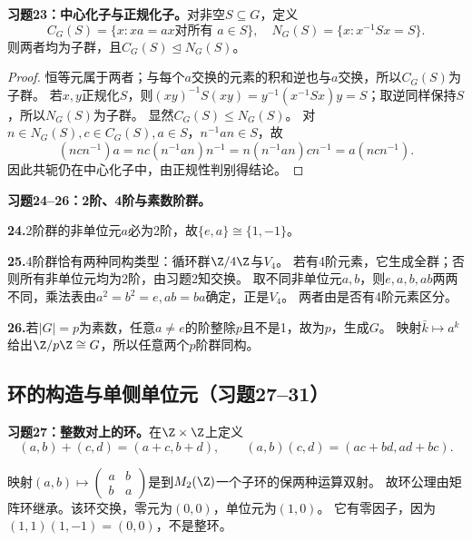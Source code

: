 \begin{problem}
\textbf{习题23：中心化子与正规化子。}对非空$S\subseteq G$，定义
\[
C_G(S)=\{x:xa=ax\text{对所有 }a\in S\},\quad
N_G(S)=\{x:x^{-1}Sx=S\}.
\]
则两者均为子群，且$C_G(S)\trianglelefteq N_G(S)$。
\end{problem}
\begin{proof}
恒等元属于两者；与每个$a$交换的元素的积和逆也与$a$交换，所以$C_G(S)$为子群。
若$x,y$正规化$S$，则$(xy)^{-1}S(xy)=y^{-1}(x^{-1}Sx)y=S$；取逆同样保持$S$，所以$N_G(S)$为子群。
显然$C_G(S)\leq N_G(S)$。
对$n\in N_G(S),c\in C_G(S),a\in S$，$n^{-1}an\in S$，故
\[
(ncn^{-1})a=n c(n^{-1}an)n^{-1}
=n(n^{-1}an)c n^{-1}=a(ncn^{-1}).
\]
因此共轭仍在中心化子中，由正规性判别得结论。
\end{proof}

\begin{problem}
\textbf{习题24--26：2阶、4阶与素数阶群。}
\end{problem}
\begin{solution}
\textbf{24.}2阶群的非单位元$a$必为2阶，故$\{e,a\}\cong\{1,-1\}$。

\textbf{25.}4阶群恰有两种同构类型：循环群$\Z/4\Z$与$V_4$。
若有4阶元素，它生成全群；否则所有非单位元均为2阶，由习题2知交换。
取不同非单位元$a,b$，则$e,a,b,ab$两两不同，乘法表由$a^2=b^2=e,ab=ba$确定，正是$V_4$。
两者由是否有4阶元素区分。

\textbf{26.}若$|G|=p$为素数，任意$a\neq e$的阶整除$p$且不是1，故为$p$，生成$G$。
映射$\bar k\mapsto a^k$给出$\Z/p\Z\cong G$，所以任意两个$p$阶群同构。
\end{solution}

\subsection*{环的构造与单侧单位元（习题27--31）}

\begin{problem}
\textbf{习题27：整数对上的环。}在$\Z\times\Z$上定义
\[
(a,b)+(c,d)=(a+c,b+d),\qquad(a,b)(c,d)=(ac+bd,ad+bc).
\]
\end{problem}
\begin{solution}
映射$(a,b)\mapsto\left(\begin{smallmatrix}a&b\\b&a\end{smallmatrix}\right)$是到$M_2(\Z)$一个子环的保两种运算双射。
故环公理由矩阵环继承。该环交换，零元为$(0,0)$，单位元为$(1,0)$。
它有零因子，因为$(1,1)(1,-1)=(0,0)$，不是整环。
\end{solution}

